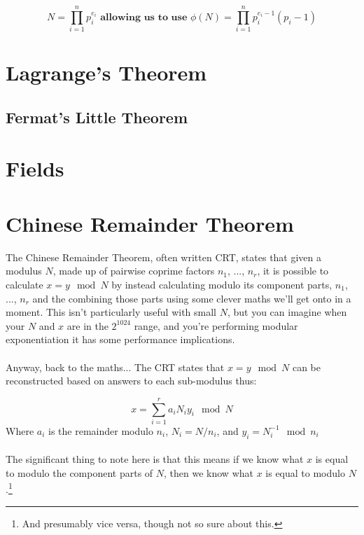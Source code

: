     $$N = \prod_{i=1}^{n}p_{i}^{e_{i}} \textbf{ allowing us to use } \phi(N) = \prod_{i=1}^{n}p_{i}^{e_{i}-1}(p_{i} - 1)$$


    \section{Lagrange's Theorem}
    
        \subsection{Fermat's Little Theorem}
        
    \section{Fields}

    
    \section{Chinese Remainder Theorem}
        The Chinese Remainder Theorem, often written CRT, states that given a modulus $N$, made up of pairwise coprime factors $n_1$, ..., $n_r$, it is possible to calculate $x = y \mod N$ by instead calculating modulo its component parts, $n_1$, ..., $n_r$ and the combining those parts using some clever maths we'll get onto in a moment. This isn't particularly useful with small $N$, but you can imagine when your $N$ and $x$ are in the $2^{1024}$ range, and you're performing modular exponentiation it has some performance implications.\\
        \\
        Anyway, back to the maths... The CRT states that $x = y \mod N$ can be reconstructed based on answers to each sub-modulus thus:

        $$ x = \sum\limits_{i=1}^{r} a_i N_i y_i \mod N $$
        Where $a_i$ is the remainder modulo $n_i$, $N_i = N/n_i$, and $y_i = N_i^{-1} \mod n_i$\\
        \\
        The significant thing to note here is that this means if we know what $x$ is equal to modulo the component parts of $N$, then we know what $x$ is equal to modulo $N$.\footnote{And presumably vice versa, though not so sure about this.}

    

